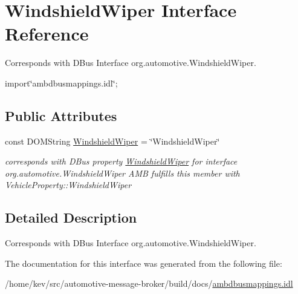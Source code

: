 \hypertarget{interfaceWindshieldWiper}{\section{Windshield\+Wiper Interface Reference}
\label{interfaceWindshieldWiper}
}


Corresponds with D\+Bus Interface org.\+automotive.\+Windshield\+Wiper.  




{\ttfamily import\char`\"{}ambdbusmappings.\+idl\char`\"{};}

\subsection*{Public Attributes}
\begin{DoxyCompactItemize}
\item 
\hypertarget{interfaceWindshieldWiper_acddede91624c4e376bc5d643dafef04c}{const D\+O\+M\+String \hyperlink{interfaceWindshieldWiper_acddede91624c4e376bc5d643dafef04c}{Windshield\+Wiper} = \char`\"{}Windshield\+Wiper\char`\"{}}\label{interfaceWindshieldWiper_acddede91624c4e376bc5d643dafef04c}

\begin{DoxyCompactList}\small\item\em corresponds with D\+Bus property \hyperlink{interfaceWindshieldWiper}{Windshield\+Wiper} for interface org.\+automotive.\+Windshield\+Wiper A\+M\+B fulfills this member with Vehicle\+Property\+::\+Windshield\+Wiper \end{DoxyCompactList}\end{DoxyCompactItemize}


\subsection{Detailed Description}
Corresponds with D\+Bus Interface org.\+automotive.\+Windshield\+Wiper. 

The documentation for this interface was generated from the following file\+:\begin{DoxyCompactItemize}
\item 
/home/kev/src/automotive-\/message-\/broker/build/docs/\hyperlink{ambdbusmappings_8idl}{ambdbusmappings.\+idl}\end{DoxyCompactItemize}
